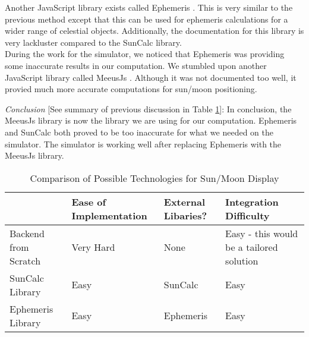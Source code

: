 \documentclass[10pt, onecolumn, draftclsnofoot, letterpaper, compsoc]{IEEEtran}
\begin{document}
Another JavaScript library exists called Ephemeris
\cite{Ephem}. This is very similar to the previous method except that this
can be used for ephemeris calculations for a wider range of celestial objects.
Additionally, the documentation for this library is very lackluster compared
to the SunCalc library. \\

During the work for the simulator, we noticed that Ephemeris was providing
some inaccurate results in our computation. We stumbled upon another JavaScript
library called MeeusJs \cite{MeeusJs}. Although it was not documented too well,
it provied much more accurate computations for sun/moon positioning.

\textit{Conclusion} [See summary of previous discussion in Table \ref{table:Jake3}]:
In conclusion, the MeeusJs library is now the library we are using for our
computation. Ephemeris and SunCalc both proved to be too inaccurate for what
we needed on the simulator. The simulator is working well after replacing
Ephemeris with the MeeusJs library. \\

\begin{table}[h]
\centering
\caption{Comparison of Possible Technologies for Sun/Moon Display}
\begin{tabular}{|p{3.15cm}|p{2cm}|p{2cm}|p{3.15cm}|}
\cline{4-4}

\hline  & Ease of Implementation & External Libaries? & Integration Difficulty
 \\ \hline

Backend from Scratch & Very Hard & None & Easy - this would be a tailored
solution \\ \hline

SunCalc Library & Easy & SunCalc & Easy \\ \hline

Ephemeris Library & Easy & Ephemeris & Easy \\ \hline

\end{tabular}
\label{table:Jake3}
\end{table}

\newpage


\end{document}
